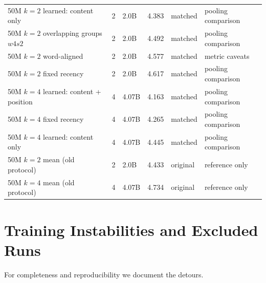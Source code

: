 \documentclass[11pt]{article}
\begin{document}
\begin{table}[h]
\begin{tabular}{llllll}
50M $k{=}2$ learned: content only & 2 & 2.0B & 4.383 & matched & pooling comparison \\
50M $k{=}2$ overlapping groups $w4s2$ & 2 & 2.0B & 4.492 & matched & pooling comparison \\
50M $k{=}2$ word-aligned & 2 & 2.0B & 4.577 & matched & metric caveats \\
50M $k{=}2$ fixed recency & 2 & 2.0B & 4.617 & matched & pooling comparison \\
50M $k{=}4$ learned: content + position & 4 & 4.07B & 4.163 & matched & pooling comparison \\
50M $k{=}4$ fixed recency & 4 & 4.07B & 4.265 & matched & pooling comparison \\
50M $k{=}4$ learned: content only & 4 & 4.07B & 4.445 & matched & pooling comparison \\
50M $k{=}2$ mean (old protocol) & 2 & 2.0B & 4.433 & original & reference only \\
50M $k{=}4$ mean (old protocol) & 4 & 4.07B & 4.734 & original & reference only \\
\bottomrule
\end{tabular}
\end{table}

\section{Training Instabilities and Excluded Runs}
\label{app:bugs}

For completeness and reproducibility we document the detours.
\end{document}

